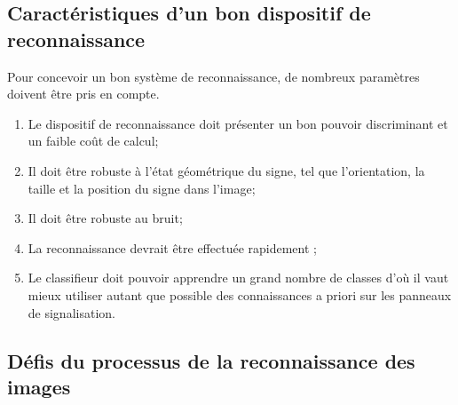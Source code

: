 \subsection{Caractéristiques d’un bon dispositif de reconnaissance }

Pour concevoir un bon système de reconnaissance, de nombreux paramètres doivent être pris en compte.

\begin{enumerate}
\item Le dispositif de reconnaissance doit présenter un bon pouvoir discriminant et un faible coût de calcul;
\item Il doit être robuste à l’état géométrique du signe, tel que l’orientation, la taille et la position du signe dans l’image;
\item Il doit être robuste au bruit;
\item La reconnaissance devrait être effectuée rapidement ;
\item Le classifieur doit pouvoir apprendre un grand nombre de classes d’où il vaut mieux utiliser autant que possible des connaissances a priori sur les panneaux de signalisation.
\end{enumerate}

\subsection{Défis du processus de la  reconnaissance des images}


